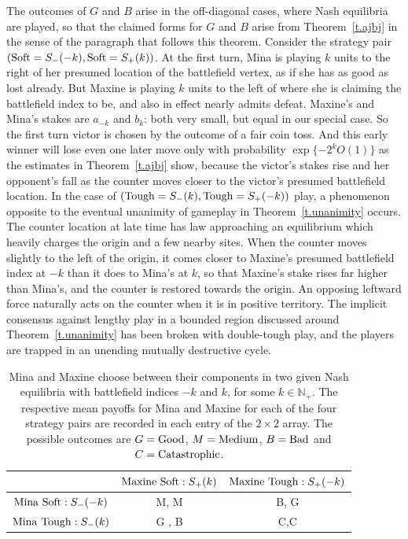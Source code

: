 \documentclass[letterpaper,11pt,oneside,reqno]{amsbook}
\newcommand{\N}{\ensuremath{\mathbb{N}}}
\numberwithin{figure}{chapter}
\theoremstyle{definition}
\theoremstyle{definition}
\theoremstyle{definition}
\theoremstyle{definition}
\theoremstyle{definition}
\newcommand{\nwithoutzero}{\N_+}
\begin{document}
 
The outcomes of $G$ and $B$ arise in the off-diagonal cases, where Nash equilibria are played, so that the claimed forms for $G$ and $B$ arise from Theorem~\ref{t.ajbj}
in the sense of the paragraph that follows this theorem. Consider the strategy pair $({\rm Soft}=S_-(-k),{\rm Soft}=S_+(k))$. 
At the first turn, Mina is playing $k$ units to the right of her presumed location of the battlefield vertex, as if she has as good as lost already. But Maxine is playing $k$ units to the left of where she is claiming the battlefield index to be, and also in effect nearly admits defeat. Maxine's and Mina's stakes are $a_{-k}$ and $b_k$: both very small, but equal in our special case. So the first turn victor is chosen by the outcome of a fair coin toss. And this early winner will lose even one later move only with probability $\exp \{- 2^k O(1) \}$ as the estimates in  Theorem~\ref{t.ajbj} show, because the victor's stakes rise and her opponent's fall as the counter moves closer to the victor's presumed battlefield location. 
In the case  of  $({\rm Tough}=S_-(k),{\rm Tough}=S_+(-k))$ play, a phenomenon opposite to the eventual unanimity of gameplay in Theorem~\ref{t.unanimity} occurs. The counter location at late time has law approaching an equilibrium which heavily charges the origin and a few nearby sites. When the counter moves slightly to the left of the origin, it comes closer to Maxine's presumed battlefield index at $-k$
than it does to Mina's at $k$, so that Maxine's stake rises far higher than Mina's, and the counter is restored towards the origin. An opposing leftward force naturally acts on the counter when it is in positive territory. The implicit consensus against lengthy play in a bounded region discussed around Theorem~\ref{t.unanimity} has been broken with double-tough play, and the players are trapped in an unending mutually destructive cycle. 


 
 \begin{table}
 \begin{center}
 \begin{tabular}{| c | c | c | }
 \hline
 &  ${\rm Maxine \, \, Soft}: S_+(k)$ & ${\rm Maxine \, \, Tough}: S_+(-k)$  \\
 \hline
  ${\rm Mina \, \,Soft}: S_-(-k)$ &  M, M & B, G \\
  ${\rm Mina \, \,Tough}: S_-(k)$ &  G , B  & C,C    \\ 
 \hline
 \end{tabular}
 \medskip
 \medskip
 \medskip
 \medskip
 \caption{Mina and Maxine choose between their components in two given Nash equilibria with battlefield indices $-k$ and $k$, for some $k \in \nwithoutzero$.
 The respective mean payoffs for Mina and Maxine for each of the four strategy pairs are recorded in each entry of the $2 \times 2$ array. The possible outcomes are $G = {\rm Good}$, ${M = \rm Medium}$,
 $B = {\rm Bad}$ and $C = {\rm Catastrophic}$.}\label{t.twobytwo}
 \end{center}
 \end{table}
\end{document}
